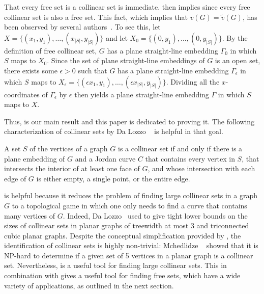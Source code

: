 That every free set is a collinear set is immediate.  then implies  since every free collinear set is also a free set. 
This fact, which implies that $v(G)=\tilde{v}(G)$, has been observed by several
authors~\cite{bose.dujmovic.ea:polynomial,dalozzo.dujmovic.ea:drawing,dujmovic:utility,gkossw-upg-09}. To
see this,
let $X=\{(x_1,y_1),\ldots,(x_{|S|},y_{|S|})\}$ and let
$X_0=\{(0,y_1),\ldots,(0,y_{|S|})\}$.  By the definition of free
collinear set, $G$ has a plane straight-line embedding $\Gamma_0$ in
which $S$ maps to $X_0$.  Since the set of plane straight-line embeddings of
$G$ is an open set, there exists some $\epsilon >0$ such that $G$ has a
plane straight-line embedding $\Gamma_{\epsilon}$ in which $S$ maps to
$X_\epsilon=\{(\epsilon x_1,y_1),\ldots,(\epsilon x_{|S|},y_{|S|})\}$.
Dividing all the $x$-coordinates of $\Gamma_\epsilon$ by $\epsilon$ then
yields a plane straight-line embedding $\Gamma$ in which $S$ maps to
$X$. 

Thus,  is our main result and this paper is dedicated to
proving it. The following
characterization of collinear sets by Da Lozzo \etal\
\cite{dalozzo.dujmovic.ea:drawing}  is helpful in that goal.

\begin{thm}\cite{dalozzo.dujmovic.ea:drawing} 
	A set $S$ of the vertices of a graph $G$ is a collinear set if and
	only if there is a plane embedding of $G$ and a Jordan curve $C$
	that contains every vertex in $S$, that intersects the interior of
	at least one face of $G$, and whose intersection with
	each edge of $G$ is either empty, a single point, or the entire edge.
\end{thm}

  is helpful because it reduces the problem of
finding large collinear sets in a graph $G$ to a topological game in
which one only needs to find a curve that contains many vertices
of $G$.  Indeed, Da Lozzo \etal\ used \thmref{collinear-set} to give
tight lower bounds on the sizes of collinear sets in planar graphs
of treewidth at most 3 and triconnected cubic planar graphs. Despite the conceptual simplification provided by ,
the identification of collinear sets is highly non-trivial:  Mchedlidze
\etal\ \cite{mchedlidze.radermacher.ea:aligned} showed that it is NP-hard to
determine if a given set of 5 vertices in a planar graph is a collinear
set.
%
Nevertheless,  is a useful tool for finding large 
collinear sets. This in combination with \corref{our-all} gives a useful
tool for finding free sets, which have a wide variety of applications,
as outlined in the next section.


